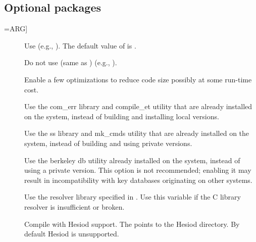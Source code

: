 \documentclass[letterpaper,10pt,english]{sphinxmanual}
\begin{document}
\subsection{Optional packages}
\label{\detokenize{build/options2configure:optional-packages}}\begin{description}
\item[{\sphinxstylestrong{-}\sphinxstyleemphasis{PACKAGE}{[}=ARG{]}}] \leavevmode
Use  (e.g., ).  The default value of 
is .

\item[{\sphinxstylestrong{-}}] \leavevmode
Do not use  (same as )
(e.g., ).

\item[{\sphinxstylestrong{-}}] \leavevmode
Enable a few optimizations to reduce code size possibly at some
run-time cost.

\item[{\sphinxstylestrong{-}}] \leavevmode
Use the com\_err library and compile\_et utility that are already
installed on the system, instead of building and installing
local versions.

\item[{\sphinxstylestrong{-}}] \leavevmode
Use the ss library and mk\_cmds utility that are already installed
on the system, instead of building and using private versions.

\item[{\sphinxstylestrong{-}}] \leavevmode
Use the berkeley db utility already installed on the system,
instead of using a private version.  This option is not
recommended; enabling it may result in incompatibility with key
databases originating on other systems.

\item[{\sphinxstylestrong{-}}] \leavevmode
Use the resolver library specified in .  Use this variable
if the C library resolver is insufficient or broken.

\item[{\sphinxstylestrong{-}}] \leavevmode
Compile with Hesiod support.  The  points to the Hesiod
directory.  By default Hesiod is unsupported.


\end{description}
\end{document}
